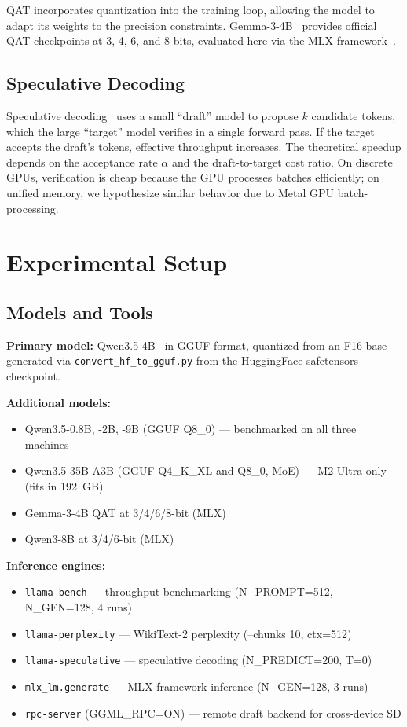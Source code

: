 \documentclass[11pt,a4paper]{article}
\begin{document}
QAT incorporates quantization into the training loop, allowing the model to
adapt its weights to the precision constraints.
Gemma-3-4B~\cite{gemma3} provides official QAT checkpoints at 3, 4, 6, and 8
bits, evaluated here via the MLX framework~\cite{mlx}.

\subsection{Speculative Decoding}

Speculative decoding~\cite{leviathan2023fast,chen2023accelerating} uses a small
``draft'' model to propose $k$ candidate tokens, which the large ``target'' model
verifies in a single forward pass.
If the target accepts the draft's tokens, effective throughput increases.
The theoretical speedup depends on the acceptance rate $\alpha$ and the
draft-to-target cost ratio.
On discrete GPUs, verification is cheap because the GPU processes batches
efficiently; on unified memory, we hypothesize similar behavior due to Metal GPU
batch-processing.

\section{Experimental Setup}

\subsection{Models and Tools}

\textbf{Primary model:} Qwen3.5-4B~\cite{qwen35} in GGUF format, quantized from
an F16 base generated via \texttt{convert\_hf\_to\_gguf.py} from the
HuggingFace safetensors checkpoint.

\textbf{Additional models:}
\begin{itemize}
  \item Qwen3.5-0.8B, -2B, -9B (GGUF Q8\_0) --- benchmarked on all three machines
  \item Qwen3.5-35B-A3B (GGUF Q4\_K\_XL and Q8\_0, MoE) --- M2 Ultra only (fits in 192~GB)
  \item Gemma-3-4B QAT at 3/4/6/8-bit (MLX)
  \item Qwen3-8B at 3/4/6-bit (MLX)
\end{itemize}

\textbf{Inference engines:}
\begin{itemize}
  \item \texttt{llama-bench} --- throughput benchmarking (N\_PROMPT=512, N\_GEN=128, 4 runs)
  \item \texttt{llama-perplexity} --- WikiText-2 perplexity (--chunks 10, ctx=512)
  \item \texttt{llama-speculative} --- speculative decoding (N\_PREDICT=200, T=0)
  \item \texttt{mlx\_lm.generate} --- MLX framework inference (N\_GEN=128, 3 runs)
  \item \texttt{rpc-server} (GGML\_RPC=ON) --- remote draft backend for cross-device SD
\end{itemize}
\end{document}
